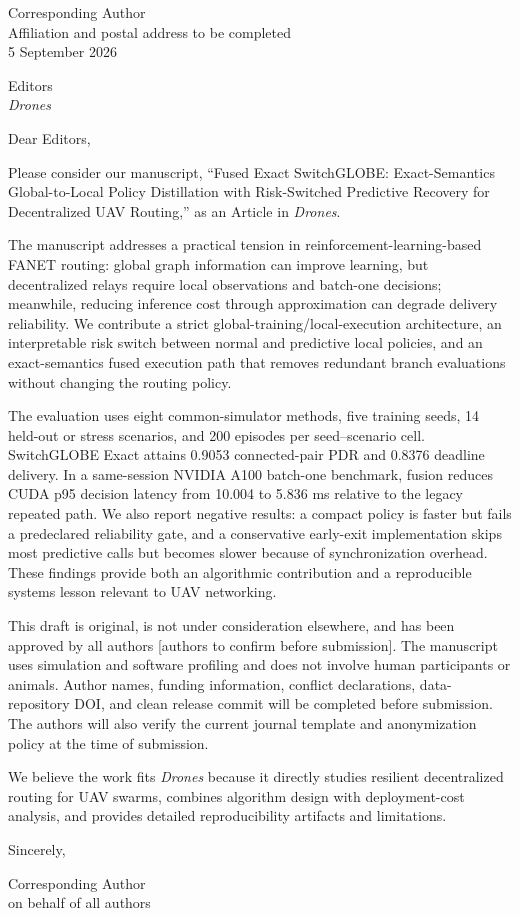 \documentclass{article}
\begin{document}
\begin{flushright}
Corresponding Author\\
Affiliation and postal address to be completed\\
5 September 2026
\end{flushright}

Editors\\
\emph{Drones}

Dear Editors,

Please consider our manuscript, ``Fused Exact SwitchGLOBE: Exact-Semantics Global-to-Local Policy Distillation with Risk-Switched Predictive Recovery for Decentralized UAV Routing,'' as an Article in \emph{Drones}.

The manuscript addresses a practical tension in reinforcement-learning-based FANET routing: global graph information can improve learning, but decentralized relays require local observations and batch-one decisions; meanwhile, reducing inference cost through approximation can degrade delivery reliability. We contribute a strict global-training/local-execution architecture, an interpretable risk switch between normal and predictive local policies, and an exact-semantics fused execution path that removes redundant branch evaluations without changing the routing policy.

The evaluation uses eight common-simulator methods, five training seeds, 14 held-out or stress scenarios, and 200 episodes per seed--scenario cell. SwitchGLOBE Exact attains 0.9053 connected-pair PDR and 0.8376 deadline delivery. In a same-session NVIDIA A100 batch-one benchmark, fusion reduces CUDA p95 decision latency from 10.004 to 5.836 ms relative to the legacy repeated path. We also report negative results: a compact policy is faster but fails a predeclared reliability gate, and a conservative early-exit implementation skips most predictive calls but becomes slower because of synchronization overhead. These findings provide both an algorithmic contribution and a reproducible systems lesson relevant to UAV networking.

This draft is original, is not under consideration elsewhere, and has been approved by all authors [authors to confirm before submission]. The manuscript uses simulation and software profiling and does not involve human participants or animals. Author names, funding information, conflict declarations, data-repository DOI, and clean release commit will be completed before submission. The authors will also verify the current journal template and anonymization policy at the time of submission.

We believe the work fits \emph{Drones} because it directly studies resilient decentralized routing for UAV swarms, combines algorithm design with deployment-cost analysis, and provides detailed reproducibility artifacts and limitations.

Sincerely,

\vspace{2em}
Corresponding Author\\
on behalf of all authors
\end{document}
